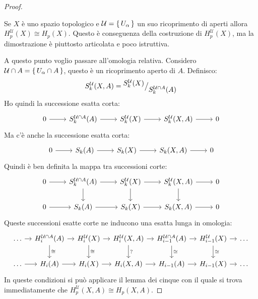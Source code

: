 \begin{proof}
  \begin{osservation}
    Se $ X $ è uno spazio topologico e $ \mathcal{U} = \set{U_\alpha} $ un suo
    ricoprimento di aperti allora $ H_p^\mathcal{U}(X) \cong H_p(X) $. Questo è
    conseguenza della costruzione di $ H^\mathcal{U}_p(X) $, ma la dimostrazione
    è piuttosto articolata e poco istruttiva.
  \end{osservation}
  A questo punto voglio passare all'omologia relativa. Considero $ \mathcal{U} \cap A = \set{U_\alpha \cap A} $,
  questo è un ricoprimento aperto di $ A $. Definisco:
  \[
    S_k^\mathcal{U}(X,A) = {^{\textstyle S_k^\mathcal{U}(X)}\big/_{\textstyle S_k^{\mathcal{U} \cap A}(A)}}
  \]
  Ho quindi la successione esatta corta:
  \[
    \begin{tikzcd}
      0 \rar & S_k^{\mathcal{U} \cap A}(A) \rar & S_k^{\mathcal{U}}(X) \rar & S_k^{\mathcal{U}}(X,A) \rar & 0
    \end{tikzcd}
  \]
  Ma c'è anche la successione esatta corta:
  \[
    \begin{tikzcd}
      0 \rar & S_k(A) \rar & S_k(X) \rar & S_k(X,A) \rar & 0
    \end{tikzcd}
  \]
  Quindi è ben definita la mappa tra successioni corte:
  \[
    \begin{tikzcd}
      0 \rar & S_k^{\mathcal{U} \cap A}(A) \rar \dar & S_k^{\mathcal{U}}(X) \rar \dar & S_k^{\mathcal{U}}(X,A) \rar \dar & 0 \\
      0 \rar & S_k(A) \rar & S_k(X) \rar & S_k(X,A) \rar & 0
    \end{tikzcd}
  \]
  Queste successioni esatte corte ne inducono una esatta lunga in omologia:
  \[
    \begin{tikzcd}[nodes={column sep = 10 pt}]
      \dots \rar & H_i^{\mathcal{U} \cap A}(A) \rar \dar{\cong} & H_i^{\mathcal{U}}(X) \rar \dar{\cong} & H_i^{\mathcal{U}}(X,A) \rar \dar{?} &  H_{i-1}^{\mathcal{U} \cap A}(A) \rar
      \dar{\cong} & H_{i-1}^{\mathcal{U}}(X) \rar \dar{\cong} & \dots \\
      \dots \rar & H_i(A) \rar & H_i(X) \rar & H_i(X,A) \rar &  H_{i-1}(A) \rar & H_{i-1}(X) \rar & \dots
    \end{tikzcd}
  \]
  In queste condizioni si può applicare il lemma dei cinque con il quale si trova immediatamente
  che  $ H_p^\mathcal{U}(X, A) \cong H_p(X,A) $.


\end{proof}
